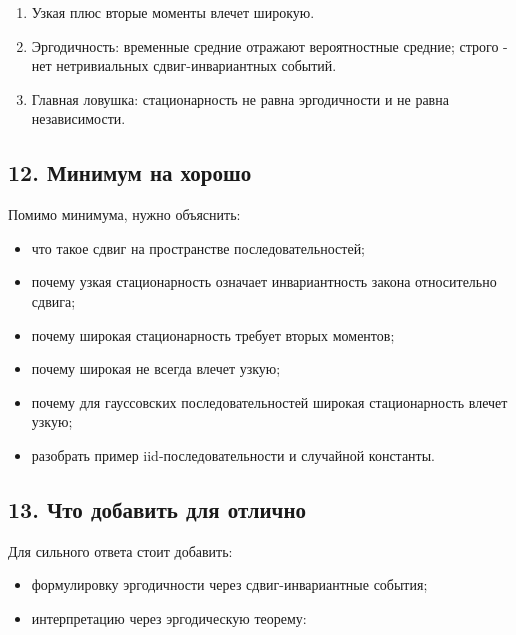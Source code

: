 \documentclass[
  11pt,
  a4paper,
]{article}
\providecommand{\tightlist}{%
  \setlength{\itemsep}{0pt}\setlength{\parskip}{0pt}}
\begin{document}
\begin{enumerate}
\def\labelenumi{\arabic{enumi}.}
\setcounter{enumi}{2}
\item
  Узкая плюс вторые моменты влечет широкую.
\item
  Эргодичность: временные средние отражают вероятностные средние; строго
  - нет нетривиальных сдвиг-инвариантных событий.
\item
  Главная ловушка: стационарность не равна эргодичности и не равна
  независимости.
\end{enumerate}

\subsection{12. Минимум на
хорошо}\label{ux43cux438ux43dux438ux43cux443ux43c-ux43dux430-ux445ux43eux440ux43eux448ux43e}

Помимо минимума, нужно объяснить:

\begin{itemize}
\tightlist
\item
  что такое сдвиг на пространстве последовательностей;
\item
  почему узкая стационарность означает инвариантность закона
  относительно сдвига;
\item
  почему широкая стационарность требует вторых моментов;
\item
  почему широкая не всегда влечет узкую;
\item
  почему для гауссовских последовательностей широкая стационарность
  влечет узкую;
\item
  разобрать пример iid-последовательности и случайной константы.
\end{itemize}

\subsection{13. Что добавить для
отлично}\label{ux447ux442ux43e-ux434ux43eux431ux430ux432ux438ux442ux44c-ux434ux43bux44f-ux43eux442ux43bux438ux447ux43dux43e}

Для сильного ответа стоит добавить:

\begin{itemize}
\tightlist
\item
  формулировку эргодичности через сдвиг-инвариантные события;
\item
  интерпретацию через эргодическую теорему:
\end{itemize}
\end{document}
